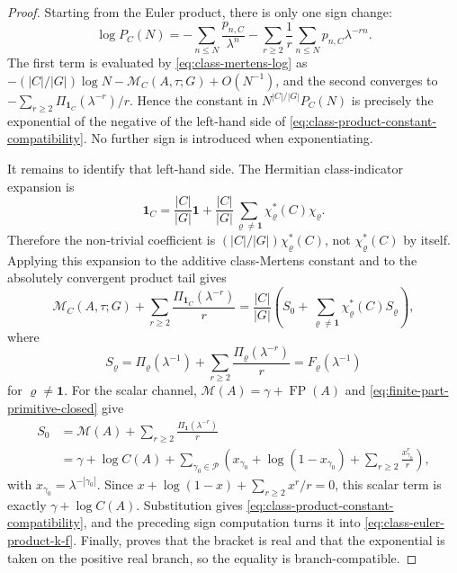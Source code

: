 \documentclass[11pt,a4paper]{amsart}
\theoremstyle{plain}
\theoremstyle{definition}
\theoremstyle{remark}
\DeclareMathOperator{\FP}{FP}
\newcommand{\cP}{\mathcal P}
\begin{document}
\begin{proof}
  Starting from the Euler product, there is only one sign change:
  \[
    \log P_C(N)
    =-
    \sum_{n\le N}\frac{p_{n,C}}{\lambda^n}
    -
    \sum_{r\ge2}\frac1r\sum_{n\le N}p_{n,C}\lambda^{-rn}.
  \]
  The first term is evaluated by
  \eqref{eq:class-mertens-log} as
  \(-(|C|/|G|)\log N-\mathcal M_C(A,\tau;G)+O(N^{-1})\), and the second
  converges to
  \(-\sum_{r\ge2}\Pi_{\mathbf1_C}(\lambda^{-r})/r\).  Hence the constant in
  \(N^{|C|/|G|}P_C(N)\) is precisely the exponential of the negative of the
  left-hand side of
  \eqref{eq:class-product-constant-compatibility}.  No further sign is
  introduced when exponentiating.

  It remains to identify that left-hand side.  The Hermitian class-indicator
  expansion is
  \[
    \mathbf1_C=\frac{|C|}{|G|}\mathbf1+\frac{|C|}{|G|}
      \sum_{\varrho\ne\mathbf1}\chi_\varrho^\ast(C)\chi_\varrho .
  \]
  Therefore the non-trivial coefficient is
  \((|C|/|G|)\chi_\varrho^\ast(C)\), not
  \(\chi_\varrho^\ast(C)\) by itself.  Applying this expansion to the
  additive class-Mertens constant and to the absolutely convergent product
  tail gives
  \[
    \mathcal M_C(A,\tau;G)+
    \sum_{r\ge2}\frac{\Pi_{\mathbf1_C}(\lambda^{-r})}{r}
    =
    \frac{|C|}{|G|}\left(S_0+
      \sum_{\varrho\ne\mathbf1}\chi_\varrho^\ast(C)S_\varrho\right),
  \]
  where
  \[
    S_\varrho=
    \Pi_\varrho(\lambda^{-1})+
    \sum_{r\ge2}\frac{\Pi_\varrho(\lambda^{-r})}{r}
    =F_\varrho(\lambda^{-1})
  \]
  for \(\varrho\ne\mathbf1\).  For the scalar channel,
  \(\mathcal M(A)=\gamma+\FP(A)\) and
  \eqref{eq:finite-part-primitive-closed} give
  \[
  \begin{aligned}
    S_0
    &=
    \mathcal M(A)+\sum_{r\ge2}\frac{\Pi_{\mathbf1}(\lambda^{-r})}{r} \\
    &=\gamma+
      \log C(A)+
      \sum_{\gamma_0\in\cP}
      \left(
        x_{\gamma_0}+\log(1-x_{\gamma_0})+
        \sum_{r\ge2}\frac{x_{\gamma_0}^r}{r}
      \right),
  \end{aligned}
  \]
  with \(x_{\gamma_0}=\lambda^{-|\gamma_0|}\).  Since
  \(x+
  \log(1-x)+\sum_{r\ge2}x^r/r=0\), this scalar term is exactly
  \(\gamma+\log C(A)\).  Substitution gives
  \eqref{eq:class-product-constant-compatibility}, and the preceding sign
  computation turns it into \eqref{eq:class-euler-product-k-f}.  Finally,
   proves that the bracket is
  real and that the exponential is taken on the positive real branch, so the
  equality is branch-compatible.
\end{proof}
\end{document}
